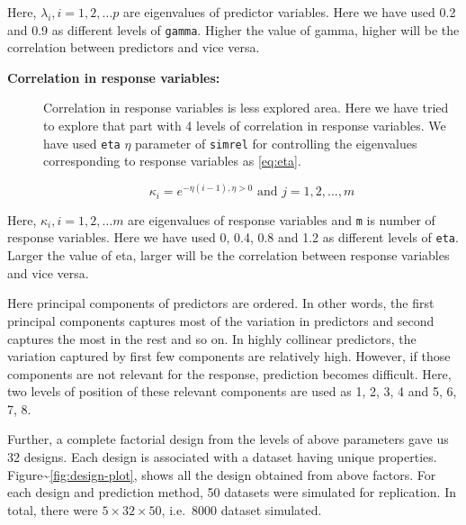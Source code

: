 \documentclass[12pt,3p,authoryear]{elsarticle}
\providecommand{\tightlist}{%
  \setlength{\itemsep}{0pt}\setlength{\parskip}{0pt}}
\begin{document}
Here, \(\lambda_i, i = 1, 2, \ldots p\) are eigenvalues of predictor
variables. Here we have used 0.2 and 0.9 as different levels of
\texttt{gamma}. Higher the value of gamma, higher will be the
correlation between predictors and vice versa.

\begin{description}
\item[\textbf{Correlation in response variables:}]
Correlation in response variables is less explored area. Here we have
tried to explore that part with 4 levels of correlation in response
variables. We have used \texttt{eta} \(\eta\) parameter of
\texttt{simrel} for controlling the eigenvalues corresponding to
response variables as \eqref{eq:eta}.

\begin{equation}
  \kappa_i = e^{-\eta(i - 1), \eta > 0} \text{ and } j = 1, 2, \ldots, m
  \label{eq:eta}
\end{equation}
\end{description}

Here, \(\kappa_i, i = 1, 2, \ldots m\) are eigenvalues of response
variables and \texttt{m} is number of response variables. Here we have
used 0, 0.4, 0.8 and 1.2 as different levels of \texttt{eta}. Larger the
value of eta, larger will be the correlation between response variables
and vice versa.

\begin{description}
\tightlist
\item[\textbf{Position of predictor components relevant to the
response:}]
Here principal components of predictors are ordered. In other words, the
first principal components captures most of the variation in predictors
and second captures the most in the rest and so on. In highly collinear
predictors, the variation captured by first few components are
relatively high. However, if those components are not relevant for the
response, prediction becomes difficult. Here, two levels of position of
these relevant components are used as 1, 2, 3, 4 and 5, 6, 7, 8.
\end{description}

Further, a complete factorial design from the levels of above parameters
gave us 32 designs. Each design is associated with a dataset having
unique properties. Figure\textasciitilde{}\ref{fig:design-plot}, shows
all the design obtained from above factors. For each design and
prediction method, 50 datasets were simulated for replication. In total,
there were \(5 \times 32 \times 50\), i.e.~8000 dataset simulated.
\end{document}
